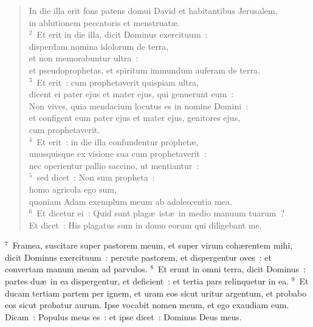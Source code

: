\begin{flushleft}\begin{verse}\vspace{-19pt}\hspace{6pt}In die illa erit fons patens domui David et habitantibus Jerusalem,\\\hspace{6pt} in ablutionem peccatoris et menstruat\ae .\\
${}^{2}$~Et erit in die illa, dicit Dominus exercituum~:\\ disperdam nomina idolorum de terra,\\ et non memorabuntur ultra~:\\ et pseudoprophetas, et spiritum immundum auferam de terra.\\
${}^{3}$~Et erit~: cum prophetaverit quispiam ultra,\\ dicent ei pater ejus et mater ejus, qui genuerunt eum~:\\ Non vives, quia mendacium locutus es in nomine Domini~:\\ et configent eum pater ejus et mater ejus, genitores ejus,\\ cum prophetaverit.\\
${}^{4}$~Et erit~: in die illa confundentur prophet\ae ,\\ unusquisque ex visione sua cum prophetaverit~:\\ nec operientur pallio saccino, ut mentiantur~:\\
${}^{5}$~sed dicet~: Non sum propheta~:\\ homo agricola ego sum,\\ quoniam Adam exemplum meum ab adolescentia mea.\\
${}^{6}$~Et dicetur ei~: Quid sunt plag\ae\ ist\ae\ in medio manuum tuarum~?\\ Et dicet~: His plagatus sum in domo eorum qui diligebant me.\end{verse}\end{flushleft}


${}^{7}$~Framea, suscitare super pastorem meum, et super virum coh\ae rentem mihi, dicit Dominus exercituum~: percute pastorem, et dispergentur oves~: et convertam manum meam ad parvulos.
${}^{8}$~Et erunt in omni terra, dicit Dominus~: partes du\ae\ in ea dispergentur, et deficient~: et tertia pars relinquetur in ea.
${}^{9}$~Et ducam tertiam partem per ignem, et uram eos sicut uritur argentum, et probabo eos sicut probatur aurum. Ipse vocabit nomen meum, et ego exaudiam eum. Dicam~: Populus meus es~: et ipse dicet~: Dominus Deus meus.

